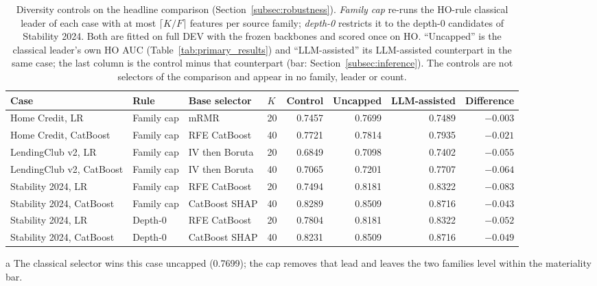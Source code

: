 \documentclass[final,5p,twocolumn]{elsarticle}
\newcommand{\Kfeat}{K}
\begin{document}
\begin{table}[htbp]
\centering
\footnotesize
\begin{threeparttable}
\caption{Diversity controls on the headline comparison (Section~\ref{subsec:robustness}). \emph{Family cap} re-runs the HO-rule classical leader of each case with at most $\lceil \Kfeat/F\rceil$ features per source family; \emph{depth-0} restricts it to the depth-0 candidates of Stability 2024. Both are fitted on full DEV with the frozen backbones and scored once on HO. ``Uncapped'' is the classical leader's own HO AUC (Table~\ref{tab:primary_results}) and ``LLM-assisted'' its LLM-assisted counterpart in the same case; the last column is the control minus that counterpart (bar: Section~\ref{subsec:inference}). The controls are not selectors of the comparison and appear in no family, leader or count.}
\label{tab:diversity}
\setlength{\tabcolsep}{5pt}
\begin{tabular}{@{}llllrrrr@{}}
\toprule
Case & Rule & Base selector & $\Kfeat$ & Control & Uncapped & LLM-assisted & Difference \\
\midrule
Home Credit, LR & Family cap & mRMR & 20 & 0.7457 & 0.7699 & 0.7489 & $-0.003$\tnote{a} \\
Home Credit, CatBoost & Family cap & RFE CatBoost & 40 & 0.7721 & 0.7814 & 0.7935 & $-0.021$ \\
LendingClub v2, LR & Family cap & IV then Boruta & 20 & 0.6849 & 0.7098 & 0.7402 & $-0.055$ \\
LendingClub v2, CatBoost & Family cap & IV then Boruta & 40 & 0.7065 & 0.7201 & 0.7707 & $-0.064$ \\
Stability 2024, LR & Family cap & RFE CatBoost & 20 & 0.7494 & 0.8181 & 0.8322 & $-0.083$ \\
Stability 2024, CatBoost & Family cap & CatBoost SHAP & 40 & 0.8289 & 0.8509 & 0.8716 & $-0.043$ \\
\addlinespace
Stability 2024, LR & Depth-0 & RFE CatBoost & 20 & 0.7804 & 0.8181 & 0.8322 & $-0.052$ \\
Stability 2024, CatBoost & Depth-0 & CatBoost SHAP & 40 & 0.8231 & 0.8509 & 0.8716 & $-0.049$ \\
\bottomrule
\end{tabular}
\begin{tablenotes}\footnotesize
\item[a] The classical selector wins this case uncapped (0.7699); the cap removes that lead and leaves the two families level within the materiality bar.
\end{tablenotes}
\end{threeparttable}
\end{table}
\end{document}
